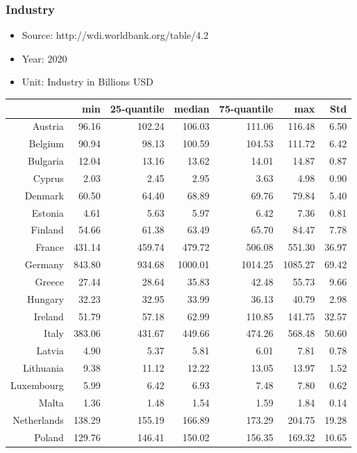 \documentclass[a4paper,twoside,10pt]{article}
\begin{document}
\subsubsection{Industry}
	\begin{itemize}
	\item Source: http://wdi.worldbank.org/table/4.2
	\item Year:  2020
	\item Unit:  Industry in Billions USD
\end{itemize}  
\begin{table}[H]
	\centering
	\begin{tabular}{|r|rrrrr|r|}
  \hline
& min & 25-quantile & median & 75-quantile & max & Std \\ 
\hline
Austria & 96.16 & 102.24 & 106.03 & 111.06 & 116.48 & 6.50 \\ 
Belgium & 90.94 & 98.13 & 100.59 & 104.53 & 111.72 & 6.42 \\ 
Bulgaria & 12.04 & 13.16 & 13.62 & 14.01 & 14.87 & 0.87 \\ 
Cyprus & 2.03 & 2.45 & 2.95 & 3.63 & 4.98 & 0.90 \\ 
Denmark & 60.50 & 64.40 & 68.89 & 69.76 & 79.84 & 5.40 \\ \hline
Estonia & 4.61 & 5.63 & 5.97 & 6.42 & 7.36 & 0.81 \\ 
Finland & 54.66 & 61.38 & 63.49 & 65.70 & 84.47 & 7.78 \\ 
France & 431.14 & 459.74 & 479.72 & 506.08 & 551.30 & 36.97 \\ 
Germany & 843.80 & 934.68 & 1000.01 & 1014.25 & 1085.27 & 69.42 \\ 
Greece & 27.44 & 28.64 & 35.83 & 42.48 & 55.73 & 9.66 \\ \hline
Hungary & 32.23 & 32.95 & 33.99 & 36.13 & 40.79 & 2.98 \\ 
Ireland & 51.79 & 57.18 & 62.99 & 110.85 & 141.75 & 32.57 \\ 
Italy & 383.06 & 431.67 & 449.66 & 474.26 & 568.48 & 50.60 \\ 
Latvia & 4.90 & 5.37 & 5.81 & 6.01 & 7.81 & 0.78 \\ 
Lithuania & 9.38 & 11.12 & 12.22 & 13.05 & 13.97 & 1.52 \\ \hline
Luxembourg & 5.99 & 6.42 & 6.93 & 7.48 & 7.80 & 0.62 \\ 
Malta & 1.36 & 1.48 & 1.54 & 1.59 & 1.84 & 0.14 \\ 
Netherlands & 138.29 & 155.19 & 166.89 & 173.29 & 204.75 & 19.28 \\ 
Poland & 129.76 & 146.41 & 150.02 & 156.35 & 169.32 & 10.65 \\ 

\end{tabular}
\end{table}
\end{document}
